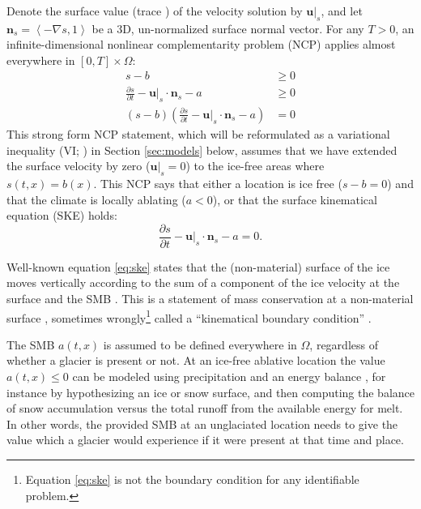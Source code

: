 \documentclass[hidelinks,onefignum,onetabnum,final]{siamart220329}  %
\newcommand{\grad}{\nabla}
\newcommand{\bn}{\mathbf{n}}
\newcommand{\bu}{\mathbf{u}}
\begin{document}
Denote the surface value (trace \cite{Evans2010}) of the velocity solution by $\bu|_s$, and let $\bn_s = \left<-\grad s,1\right>$ be a 3D, un-normalized surface normal vector.  For any $T>0$, an infinite-dimensional nonlinear complementarity problem (NCP) \cite{Bueler2021conservation,FacchineiPang2003,SchoofHewitt2013} applies almost everywhere in $[0,T]\times \Omega$:
\begin{subequations}
\label{eq:ncp}
\begin{align}
s - b &\ge 0 \\
\frac{\partial s}{\partial t} - \bu|_s \cdot \bn_s - a &\ge 0 \\
(s - b) \left(\frac{\partial s}{\partial t} - \bu|_s \cdot \bn_s - a\right) &= 0
\end{align}
\end{subequations}
This strong form NCP statement, which will be reformulated as a variational inequality (VI; \cite{KinderlehrerStampacchia1980}) in Section \ref{sec:models} below, assumes that we have extended the surface velocity by zero ($\bu|_s=0$) to the ice-free areas where $s(t,x)=b(x)$.  This NCP says that either a location is ice free ($s-b=0$) and that the climate is locally ablating ($a<0$), or that the surface kinematical equation (SKE) holds:
\begin{equation}
\frac{\partial s}{\partial t} - \bu|_s \cdot \bn_s - a = 0.  \label{eq:ske}
\end{equation}

Well-known equation \eqref{eq:ske} states that the (non-material) surface of the ice moves vertically according to the sum of a component of the ice velocity at the surface and the SMB \cite{SchoofHewitt2013}.  This is a statement of mass conservation at a non-material surface \cite{Aschwandenetal2012}, sometimes wrongly\footnote{Equation \eqref{eq:ske} is not the boundary condition for any identifiable problem.} called a ``kinematical boundary condition'' \cite{GreveBlatter2009}.

The SMB $a(t,x)$ is assumed to be defined everywhere in $\Omega$, regardless of whether a glacier is present or not.  At an ice-free ablative location the value $a(t,x)\le 0$ can be modeled using precipitation and an energy balance \cite{GreveBlatter2009}, for instance by hypothesizing an ice or snow surface, and then computing the balance of snow accumulation versus the total runoff from the available energy for melt.  In other words, the provided SMB at an unglaciated location needs to give the value which a glacier would experience if it were present at that time and place.
\end{document}
